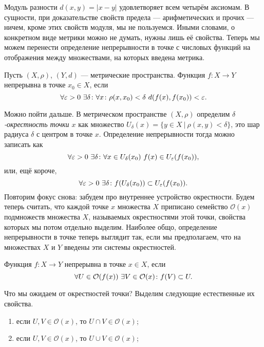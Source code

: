 Модуль разности $d(x,y)=|x-y|$ удовлетворяет всем четырём аксиомам. В сущности, при доказательстве свойств предела --- арифметических и прочих --- ничем, кроме этих свойств модуля, мы не пользуемся. Иными словами, о конкретном виде метрики можно не думать, нужны лишь её свойства. Теперь мы можем перенести определение непрерывности в точке с числовых функций на отображения между множествами, на которых введена метрика.
\begin{defin}
	Пусть $(X,\rho)$, $(Y,d)$ --- метрические пространства. Функция $f\colon X\to Y$ непрерывна в точке $x_0\in X$, если
	\begin{equation}
		\forall\varepsilon>0\ \exists\delta\such\forall x\such \rho(x,x_0)<\delta\ d(f(x),f(x_0))<\varepsilon.
	\end{equation}
\end{defin}
Можно пойти дальше. В метрическом пространстве $(X,\rho)$ определим \textit{$\delta$-окрестность точки $x$} как множество $U_{\delta}(x)=\{y\in X\ |\ \rho(x,y)<\delta\}$, это шар радиуса $\delta$ с центром в точке $x$. Определение непрерывности тогда можно записать как
	\begin{equation}
		\forall\varepsilon>0\ \exists\delta\such\forall x\in U_{\delta}(x_0)\ f(x)\in U_{\varepsilon}(f(x_0)),
	\end{equation}
или, ещё короче,
	\begin{equation}
		\forall\varepsilon>0\ \exists\delta\colon f(U_{\delta}(x_0))\subset U_{\varepsilon}(f(x_0)).
	\end{equation}
Повторим фокус снова: забудем про внутреннее устройство окрестности. Будем теперь считать, что каждой точке $x$ множества $X$ приписано семейство $\mathcal{O}(x)$ подмножеств множества $X$, называемых окрестностями этой точки, свойства которых мы потом отдельно выделим. Наиболее общо, определение непрерывности в точке теперь выглядит так, если мы предполагаем, что на множествах $X$ и $Y$ введены эти системы окрестностей.
\begin{defin}
	Функция $f\colon X\to Y$ непрерывна в точке $x\in X$, если
	\begin{equation}
		\forall U\in\mathcal{O}(f(x))\ \exists V\in\mathcal{O}(x)\colon f(V)\subset U.
	\end{equation}
\end{defin}
Что мы ожидаем от окрестностей точки? Выделим следующие естественные их свойства.
\begin{enumerate}
	\item если $U, V\in\mathcal{O}(x)$, то $U\cap V\in\mathcal{O}(x)$;
	\item если $U, V\in\mathcal{O}(x)$, то $U\cup V\in\mathcal{O}(x)$;
\end{enumerate}

